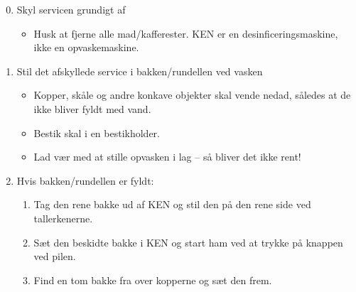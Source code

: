 \documentclass{article}
\begin{document}

\maketitle

\fontsize{17.28}{18}\selectfont

\begin{enumerate}

\setcounter{enumi}{-1}

\bfseries \item Skyl servicen grundigt af \normalfont

  \begin{itemize}

  \item Husk at fjerne alle mad/kafferester.  KEN er en
    desinficeringsmaskine, ikke en opvaskemaskine.

  \end{itemize}

\bfseries \item Stil det afskyllede service i bakken/rundellen ved vasken
\normalfont

\begin{itemize}

  \item Kopper, skåle og andre konkave objekter skal vende nedad,
    således at de ikke bliver fyldt med vand.

  \item Bestik skal i en bestikholder.

  \item Lad vær med at stille opvasken i lag -- så bliver det ikke rent!

  \end{itemize}

\bfseries \item Hvis bakken/rundellen er fyldt: \normalfont
  \begin{enumerate}

  \item Tag den rene bakke ud af KEN og stil den på den rene side ved
    tallerkenerne.

  \item Sæt den beskidte bakke i KEN og start ham ved at trykke på
    knappen ved pilen.

  \item Find en tom bakke fra over kopperne og sæt den frem.

  \end{enumerate}


\end{enumerate}
\end{document}

